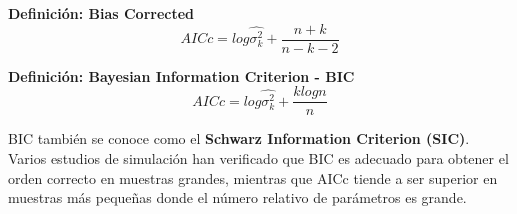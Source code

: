 %
\begin{mdframed}[style=MyFrame]
	\begin{definition}\label{def15}
		\textbf{Definici\'on:  Bias Corrected}
		\begin{equation*}
				AICc = log \hat{\sigma_k^2} + \frac{n+k}{n-k-2} 
		\end{equation*}
	\end{definition}
\end{mdframed}

\begin{mdframed}[style=MyFrame]
	\begin{definition}\label{def16}
		\textbf{Definici\'on:  Bayesian Information Criterion - BIC}
		\begin{equation*}
		AICc = log \hat{\sigma_k^2} + \frac{k log n}{n} 
		\end{equation*}		
	\end{definition}
\end{mdframed}
BIC tambi\'en se conoce como el \textbf{Schwarz Information Criterion (SIC)}. Varios estudios de simulaci\'on han verificado que BIC es adecuado para obtener el orden correcto en muestras grandes, mientras que AICc tiende a ser superior en muestras m\'as peque\~nas donde el n\'umero relativo de par\'ametros es grande.




